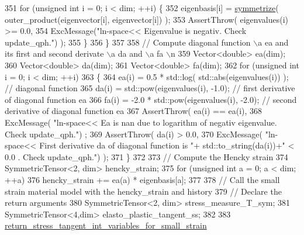 \begin{DoxyCode}
351             \textcolor{keywordflow}{for} (\textcolor{keywordtype}{unsigned} \textcolor{keywordtype}{int} i = 0; i < dim; ++i) \{
352                 eigenbasis[i] = \hyperlink{functions_8h_afe83e9509497294b7f662b800b6b91ff}{symmetrize}( outer\_product(eigenvector[i], eigenvector[i]) );
353                 AssertThrow( eigenvalues(i) >= 0.0,
354                              ExcMessage(\textcolor{stringliteral}{"ln-space<< Eigenvalue is negativ. Check update\_qph."}) );
355             \}
356          \}
357 
358         \textcolor{comment}{// Compute diagonal function \(\backslash\)a ea and its first and second derivate \(\backslash\)a da and \(\backslash\)a fa \(\backslash\)n}
359          Vector<double> ea(dim);
360          Vector<double> da(dim);
361          Vector<double> fa(dim);
362          \textcolor{keywordflow}{for} (\textcolor{keywordtype}{unsigned} \textcolor{keywordtype}{int} i = 0; i < dim; ++i)
363          \{
364             ea(i) = 0.5 * std::log( std::abs(eigenvalues(i)) ); \textcolor{comment}{// diagonal function}
365             da(i) = std::pow(eigenvalues(i), -1.0);             \textcolor{comment}{// first derivative of diagonal function ea}
366             fa(i) = -2.0 * std::pow(eigenvalues(i), -2.0);          \textcolor{comment}{// second derivative of diagonal
       function ea}
367             AssertThrow( ea(i) == ea(i),
368                          ExcMessage( \textcolor{stringliteral}{"ln-space<< Ea is nan due to logarithm of negativ eigenvalue. Check
       update\_qph."}) ;
369             AssertThrow( da(i) > 0.0,
370                          ExcMessage( \textcolor{stringliteral}{"ln-space<< First derivative da of diagonal function is "}+
      std::to\_string(da(i))+\textcolor{stringliteral}{" < 0.0 . Check update\_qph."}) );
371          \}
372 
373         \textcolor{comment}{// Compute the Hencky strain}
374          SymmetricTensor<2, dim> hencky\_strain;
375          \textcolor{keywordflow}{for} (\textcolor{keywordtype}{unsigned} \textcolor{keywordtype}{int} a = 0; a < dim; ++a)
376             hencky\_strain += ea(a) * eigenbasis[a];
377 
378         \textcolor{comment}{// Call the small strain material model with the hencky\_strain and history}
379          \textcolor{comment}{// Declare the return arguments}
380           SymmetricTensor<2, dim> stress\_measure\_T\_sym;
381           SymmetricTensor<4,dim> elasto\_plastic\_tangent\_ss;
382 
383          \hyperlink{classConstitutive__Laws_1_1Thermo__Elasto__Plastic_a1d4b992d9e803ccfbd56d344f9ca7e41}{return\_stress\_tangent\_int\_variables\_for\_small\_strain}

\end{DoxyCode}
